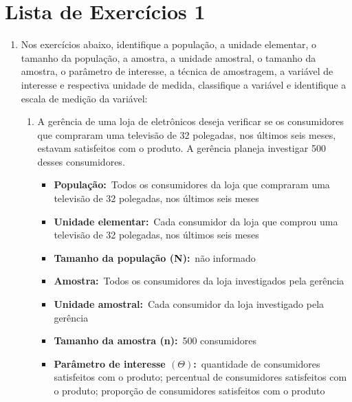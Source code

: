 \chapter{Lista de Exercícios 1}

\begin{enumerate}[label=\emph{\arabic*})]
	\item Nos exercícios abaixo, identifique a população, a unidade elementar, o tamanho da	população, a amostra, a unidade amostral, o tamanho da amostra, o parâmetro de interesse, a técnica de amostragem, a variável de interesse e respectiva unidade de medida, classifique a variável e identifique a escala de medição da variável:

	      \begin{enumerate}[label=\emph{\alph*})]

		      \item A gerência de uma loja de eletrônicos deseja verificar se os consumidores que compraram uma televisão de 32 polegadas, nos últimos seis meses, estavam satisfeitos com o produto. A gerência planeja investigar 500 desses consumidores.

		            \begin{itemize}
			            \item \textbf{População:}~Todos os consumidores da loja que compraram uma televisão de 32 polegadas, nos últimos seis meses

			            \item \textbf{Unidade elementar:}~Cada consumidor da loja que comprou uma televisão de 32 polegadas, nos
			                  últimos seis meses

			            \item \textbf{Tamanho da população (N):}~não informado

			            \item \textbf{Amostra:}~Todos os consumidores da loja investigados pela gerência

			            \item \textbf{Unidade amostral:}~Cada consumidor da loja investigado pela gerência

			            \item \textbf{Tamanho da amostra (n):}~500 consumidores

			            \item \textbf{Parâmetro de interesse $\left(\varTheta\right)$:}~quantidade de consumidores satisfeitos com o produto; percentual de
			                  consumidores satisfeitos com o produto; proporção de consumidores satisfeitos com o produto


\end{itemize}
\end{enumerate}
\end{enumerate}
